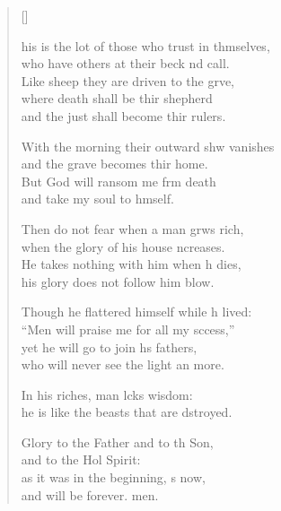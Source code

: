 \settowidth{\versewidth}{This is the lot of those who trust in themselves, *}
\begin{verse}[\versewidth]
  \begin{patverse}
his is the lot of those who trust in thmselves,\Med\\
who have others at their beck nd call.\\
Like sheep they are driven to the grve,\Flex\\
where death shall be thir shepherd\Med\\
and the just shall become thir rulers.

With the morning their outward shw vanishes\Med\\
and the grave becomes thir home.\\
But God will ransom me frm death\Med\\
and take my soul to h\pointup{\i}mself.

Then do not fear when a man grws rich,\Med\\
when the glory of his house \pointup{\i}ncreases.\\
He takes nothing with him when h dies,\Med\\
his glory does not follow him blow.

Though he flattered himself while h lived:\Med\\
“Men will praise me for all my sccess,”\\
yet he will go to join h\pointup{\i}s fathers,\Med\\
who will never see the light an more.

In his riches, man lcks wisdom:\Med\\
he is like the beasts that are dstroyed.

Glory to the Father and to th Son,\Med\\
and to the Hol Spirit:\\
as it was in the beginning, \pointup{\i}s now,\Med\\
and will be forever. men. 
  \end{patverse}
\end{verse}
